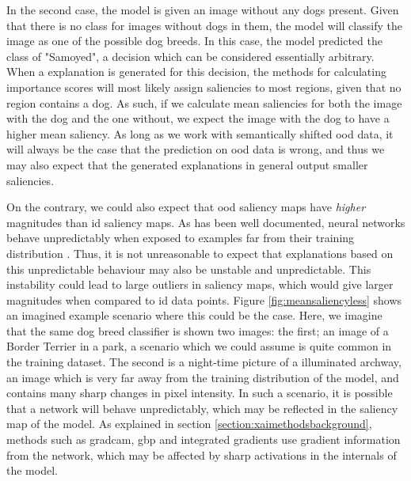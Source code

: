 \documentclass[UKenglish]{uiomasterthesis} %
\theoremstyle{definition}
\begin{document}
In the second case, the model is given an image without any dogs present. Given that there is no class for images without dogs in them, the model will classify the image as one of the possible dog breeds. In this case, the model predicted the class of "Samoyed", a decision which can be considered essentially arbitrary. When a explanation is generated for this decision, the methods for calculating importance scores will most likely assign saliencies to most regions, given that no region contains a dog. As such, if we calculate mean saliencies for both the image with the dog and the one without, we expect the image with the dog to have a higher mean saliency. As long as we work with semantically shifted \ac{ood} data, it will always be the case that the prediction on \ac{ood} data is wrong, and thus we may also expect that the generated explanations in general output smaller saliencies.

On the contrary, we could also expect that \ac{ood} saliency maps have {\it higher} magnitudes than \ac{id} saliency maps. As has been well documented, neural networks behave unpredictably when exposed to examples far from their training distribution \cite{nguyen2015deepneuralnetworkseasily, geirhos2020shortcut, goodfellow2015explainingharnessingadversarialexamples}. Thus, it is not unreasonable to expect that explanations based on this unpredictable behaviour may also be unstable and unpredictable. This instability could lead to large outliers in saliency maps, which would give larger magnitudes when compared to \ac{id} data points. Figure \ref{fig:meansaliencyless} shows an imagined example scenario where this could be the case. Here, we imagine that the same dog breed classifier is shown two images: the first; an image of a Border Terrier in a park, a scenario which we could assume is quite common in the training dataset. The second is a night-time picture of a illuminated archway, an image which is very far away from the training distribution of the model, and contains many sharp changes in pixel intensity. In such a scenario, it is possible that a network will behave unpredictably, which may be reflected in the saliency map of the model. As explained in section \ref{section:xaimethodsbackground}, methods such as \ac{gradcam}, \ac{gbp} and integrated gradients use gradient information from the network, which may be affected by sharp activations in the internals of the model.
\end{document}
